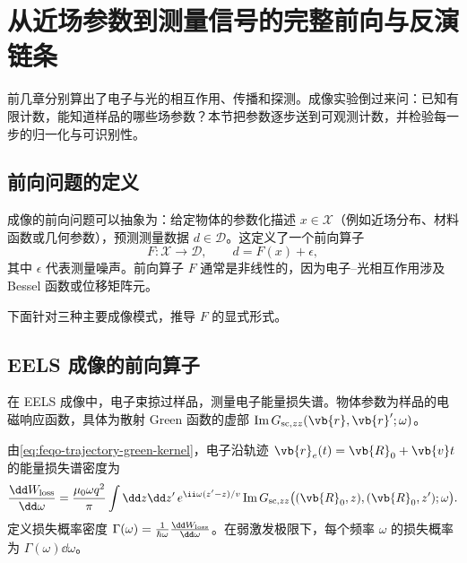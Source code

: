 \section{从近场参数到测量信号的完整前向与反演链条}
\label{chap:feqo-end-to-end}

前几章分别算出了电子与光的相互作用、传播和探测。成像实验倒过来问：已知有限计数，能知道样品的哪些场参数？本节把参数逐步送到可观测计数，并检验每一步的归一化与可识别性。

\subsection{前向问题的定义}

成像的前向问题可以抽象为：给定物体的参数化描述 \(x\in\mathcal X\)（例如近场分布、材料函数或几何参数），预测测量数据 \(d\in\mathcal D\)。这定义了一个前向算子
\begin{equation}
F:\mathcal X\to\mathcal D,\qquad d=F(x)+\epsilon,
\label{eq:feqo-forward-operator}
\end{equation}
其中 \(\epsilon\) 代表测量噪声。前向算子 \(F\) 通常是非线性的，因为电子--光相互作用涉及 Bessel 函数或位移矩阵元。\

下面针对三种主要成像模式，推导 \(F\) 的显式形式。

\subsection{EELS 成像的前向算子}

在 EELS 成像中，电子束掠过样品，测量电子能量损失谱。物体参数为样品的电磁响应函数，具体为散射 Green 函数的虚部 \(\operatorname{Im}G_{{\rm sc},zz}(\vb{r},\vb{r}';\omega)\)。

由\cref{eq:feqo-trajectory-green-kernel}，电子沿轨迹 \(\vb{r}_e(t)=\vb{R}_0+\vb{v}t\) 的能量损失谱密度为
\begin{equation}
\frac{\dd W_{\rm loss}}{\dd\omega}
=\frac{\mu_0\omega q^2}{\pi}
\int\dd z\dd z'\,e^{\ii\omega(z'-z)/v}
\operatorname{Im}G_{{\rm sc},zz}
\bigl((\vb{R}_0,z),(\vb{R}_0,z');\omega\bigr).
\label{eq:feqo-eels-forward-green}
\end{equation}
定义损失概率密度 \(\Gamma(\omega)=\frac{1}{\hbar\omega}\frac{\dd W_{\rm loss}}{\dd\omega}\)。在弱激发极限下，每个频率 \(\omega\) 的损失概率为 \(\Gamma(\omega)\dd\omega\)。


